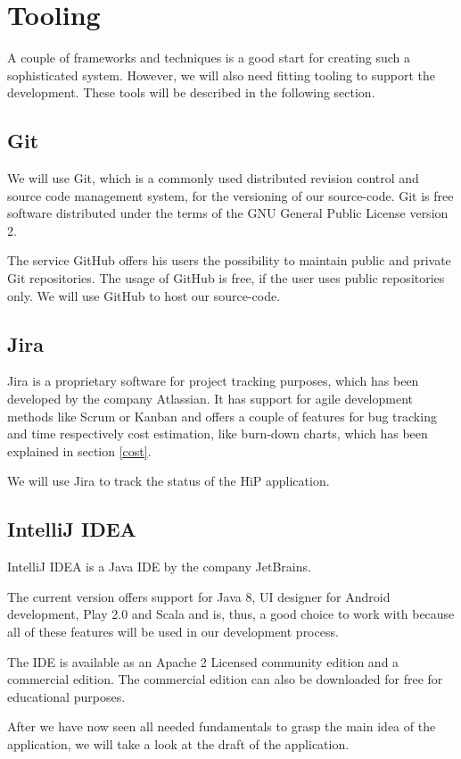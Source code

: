 \section{Tooling}
A couple of frameworks and techniques is a good start for creating such a sophisticated system. However, we will also need fitting tooling to support the development. These tools will be described in the following section.

\subsection{Git}
We will use Git, which is a commonly used distributed revision control and source code management system, for the versioning of our source-code. Git is free software distributed under the terms of the GNU General Public License version 2.

The service GitHub offers his users the possibility to maintain public and private Git repositories. The usage of GitHub is free, if the user uses public repositories only. We will use GitHub to host our source-code.

\subsection{Jira}
Jira is a proprietary software for project tracking purposes, which has been developed by the company Atlassian. It has support for agile development methods like Scrum or Kanban and offers a couple of features for bug tracking and time respectively cost estimation, like burn-down charts, which has been explained in section \ref{cost}. 

We will use Jira to track the status of the \ac{HiP} application.

\subsection{IntelliJ IDEA}
IntelliJ IDEA is a Java \ac{IDE} by the company JetBrains. 

The current version offers support for Java 8, UI designer for Android development, Play 2.0 and Scala and is, thus, a good choice to work with because all of these features will be used in our development process.

The \ac{IDE} is available as an Apache 2 Licensed community edition and a commercial edition. The commercial edition can also be downloaded for free for educational purposes.

After we have now seen all needed fundamentals to grasp the main idea of the application, we will take a look at the draft of the application.